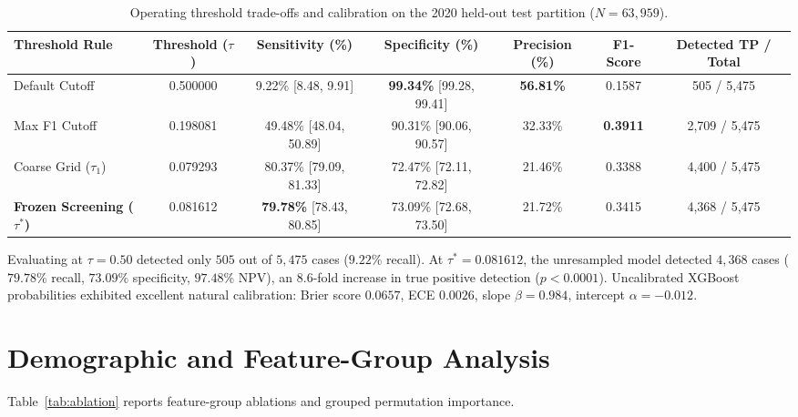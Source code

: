\documentclass[11pt,a4paper]{article}
\begin{document}
\begin{table}[htbp]
\centering
\small
\caption{Operating threshold trade-offs and calibration on the 2020 held-out test partition ($N = 63,959$).}
\label{tab:thresholds}
\begin{tabular}{lcccccc}
\toprule
Threshold Rule & Threshold ($\tau$) & Sensitivity (\%) & Specificity (\%) & Precision (\%) & F1-Score & Detected TP / Total \\
\midrule
Default Cutoff & 0.500000 & 9.22\% [8.48, 9.91] & \textbf{99.34\%} [99.28, 99.41] & \textbf{56.81\%} & 0.1587 & 505 / 5,475 \\
Max F1 Cutoff & 0.198081 & 49.48\% [48.04, 50.89] & 90.31\% [90.06, 90.57] & 32.33\% & \textbf{0.3911} & 2,709 / 5,475 \\
Coarse Grid ($\tau_1$) & 0.079293 & 80.37\% [79.09, 81.33] & 72.47\% [72.11, 72.82] & 21.46\% & 0.3388 & 4,400 / 5,475 \\
\textbf{Frozen Screening ($\tau^*$)} & 0.081612 & \textbf{79.78\%} [78.43, 80.85] & 73.09\% [72.68, 73.50] & 21.72\% & 0.3415 & 4,368 / 5,475 \\
\bottomrule
\end{tabular}
\end{table}

Evaluating at $\tau = 0.50$ detected only $505$ out of $5,475$ cases ($9.22\%$ recall). At $\tau^* = 0.081612$, the unresampled model detected $4,368$ cases ($79.78\%$ recall, $73.09\%$ specificity, $97.48\%$ NPV), an $8.6$-fold increase in true positive detection ($p < 0.0001$). Uncalibrated XGBoost probabilities exhibited excellent natural calibration: Brier score $0.0657$, ECE $0.0026$, slope $\beta = 0.984$, intercept $\alpha = -0.012$.

\section{Demographic and Feature-Group Analysis}

Table~\ref{tab:ablation} reports feature-group ablations and grouped permutation importance.
\end{document}
